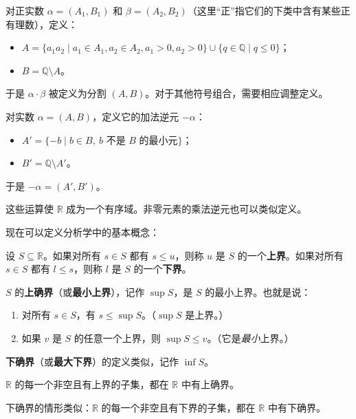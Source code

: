 \begin{definition}[正实数的乘法]
对正实数 $\alpha=(A_1,B_1)$ 和 $\beta=(A_2,B_2)$（这里“正”指它们的下类中含有某些正有理数），定义：
\begin{itemize}
    \item $A=\{a_1a_2\mid a_1\in A_1,a_2\in A_2,a_1>0,a_2>0\}\cup \{q\in \mathbb{Q}\mid q\le 0\}$；
    \item $B=\mathbb{Q}\setminus A$。
\end{itemize}
于是 $\alpha\cdot\beta$ 被定义为分割 $(A,B)$。对于其他符号组合，需要相应调整定义。
\end{definition}

\begin{definition}[加法逆元]
对实数 $\alpha=(A,B)$，定义它的加法逆元 $-\alpha$：
\begin{itemize}
    \item $A'=\{-b\mid b\in B,\ b\text{ 不是 }B\text{ 的最小元}\}$；
    \item $B'=\mathbb{Q}\setminus A'$。
\end{itemize}
于是 $-\alpha=(A',B')$。
\end{definition}

这些运算使 $\mathbb{R}$ 成为一个有序域。非零元素的乘法逆元也可以类似定义。

现在可以定义分析学中的基本概念：

\begin{definition}[上界]
设 $S\subseteq \mathbb{R}$。如果对所有 $s\in S$ 都有 $s\le u$，则称 $u$ 是 $S$ 的一个\textbf{上界}。如果对所有 $s\in S$ 都有 $l\le s$，则称 $l$ 是 $S$ 的一个\textbf{下界}。
\end{definition}

\begin{definition}[上确界]
$S$ 的\textbf{上确界}（或\textbf{最小上界}），记作 $\sup S$，是 $S$ 的最小上界。也就是说：
\begin{enumerate}
    \item 对所有 $s\in S$，有 $s\le \sup S$。（$\sup S$ 是上界。）
    \item 如果 $v$ 是 $S$ 的任意一个上界，则 $\sup S\le v$。（它是\emph{最小}上界。）
\end{enumerate}
\textbf{下确界}（或\textbf{最大下界}）的定义类似，记作 $\inf S$。
\end{definition}

\begin{theorem}[完备性公理]
$\mathbb{R}$ 的每一个非空且有上界的子集，都在 $\mathbb{R}$ 中有上确界。
\end{theorem}
下确界的情形类似：$\mathbb{R}$ 的每一个非空且有下界的子集，都在 $\mathbb{R}$ 中有下确界。

